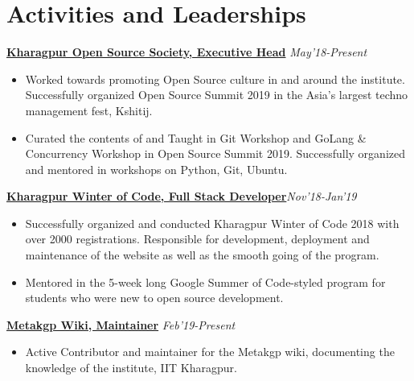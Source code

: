 \documentclass[a4paper,10pt]{extarticle} %
\begin{document}

\section{\textcolor{primary}{Activities and Leaderships}}


    \textbf{\href{https://kossiitkgp.in/}{Kharagpur Open Source Society, Executive Head}} \hfill\textit{\small{May'18-Present}}
    \begin{itemize}[leftmargin=.15in]
        \item Worked towards promoting Open Source culture in and around the institute. Successfully organized Open Source Summit 2019 in the Asia's largest techno management fest, Kshitij.
        \item Curated the contents of and Taught in Git Workshop and GoLang \& Concurrency Workshop in Open Source Summit 2019. Successfully organized and mentored in workshops on Python, Git, Ubuntu.
    \end{itemize}

\textbf{\href{https://github.com/kossiitkgp/kwoc-2018}{Kharagpur Winter of Code, Full Stack Developer}}\hfill\textit{\small{Nov'18-Jan'19}}
    \begin{itemize}[leftmargin=.15in]
        \item Successfully organized and conducted Kharagpur Winter of Code 2018 with over 2000 registrations. Responsible for development, deployment and maintenance of the website as well as the smooth going of the program.
        \item Mentored in the 5-week long Google Summer of Code-styled program for students who were new to open source development.
    \end{itemize}

\textbf{\href{https://wiki.metakgp.org}{Metakgp Wiki, Maintainer}} \hfill\textit{\small{Feb'19-Present}}
    \begin{itemize}[leftmargin=.15in]
        \item Active Contributor and maintainer for the Metakgp wiki, documenting the knowledge of the institute, IIT Kharagpur.
    \end{itemize}
\end{document}
